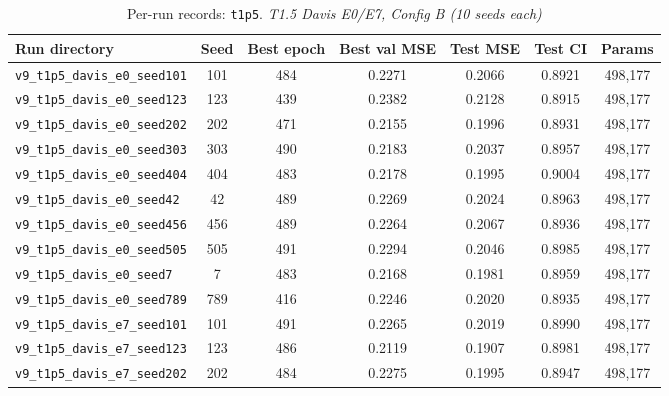 \begin{table}[!h]
\centering\scriptsize
\caption{Per-run records: \texttt{t1p5}. \textit{T1.5 Davis E0/E7, Config B (10 seeds each)}}
\label{tab:v9_runs_t1p5}
\begin{tabular}{p{4.8cm}cccccc}
\toprule
Run directory & Seed & Best epoch & Best val MSE & Test MSE & Test CI & Params \\
\midrule
\texttt{v9\_\allowbreak{}t1p5\_\allowbreak{}davis\_\allowbreak{}e0\_\allowbreak{}seed101} & 101 & 484 & 0.2271 & 0.2066 & 0.8921 & 498,177 \\
\texttt{v9\_\allowbreak{}t1p5\_\allowbreak{}davis\_\allowbreak{}e0\_\allowbreak{}seed123} & 123 & 439 & 0.2382 & 0.2128 & 0.8915 & 498,177 \\
\texttt{v9\_\allowbreak{}t1p5\_\allowbreak{}davis\_\allowbreak{}e0\_\allowbreak{}seed202} & 202 & 471 & 0.2155 & 0.1996 & 0.8931 & 498,177 \\
\texttt{v9\_\allowbreak{}t1p5\_\allowbreak{}davis\_\allowbreak{}e0\_\allowbreak{}seed303} & 303 & 490 & 0.2183 & 0.2037 & 0.8957 & 498,177 \\
\texttt{v9\_\allowbreak{}t1p5\_\allowbreak{}davis\_\allowbreak{}e0\_\allowbreak{}seed404} & 404 & 483 & 0.2178 & 0.1995 & 0.9004 & 498,177 \\
\texttt{v9\_\allowbreak{}t1p5\_\allowbreak{}davis\_\allowbreak{}e0\_\allowbreak{}seed42} & 42 & 489 & 0.2269 & 0.2024 & 0.8963 & 498,177 \\
\texttt{v9\_\allowbreak{}t1p5\_\allowbreak{}davis\_\allowbreak{}e0\_\allowbreak{}seed456} & 456 & 489 & 0.2264 & 0.2067 & 0.8936 & 498,177 \\
\texttt{v9\_\allowbreak{}t1p5\_\allowbreak{}davis\_\allowbreak{}e0\_\allowbreak{}seed505} & 505 & 491 & 0.2294 & 0.2046 & 0.8985 & 498,177 \\
\texttt{v9\_\allowbreak{}t1p5\_\allowbreak{}davis\_\allowbreak{}e0\_\allowbreak{}seed7} & 7 & 483 & 0.2168 & 0.1981 & 0.8959 & 498,177 \\
\texttt{v9\_\allowbreak{}t1p5\_\allowbreak{}davis\_\allowbreak{}e0\_\allowbreak{}seed789} & 789 & 416 & 0.2246 & 0.2020 & 0.8935 & 498,177 \\
\texttt{v9\_\allowbreak{}t1p5\_\allowbreak{}davis\_\allowbreak{}e7\_\allowbreak{}seed101} & 101 & 491 & 0.2265 & 0.2019 & 0.8990 & 498,177 \\
\texttt{v9\_\allowbreak{}t1p5\_\allowbreak{}davis\_\allowbreak{}e7\_\allowbreak{}seed123} & 123 & 486 & 0.2119 & 0.1907 & 0.8981 & 498,177 \\
\texttt{v9\_\allowbreak{}t1p5\_\allowbreak{}davis\_\allowbreak{}e7\_\allowbreak{}seed202} & 202 & 484 & 0.2275 & 0.1995 & 0.8947 & 498,177 \\

\end{tabular}
\end{table}
